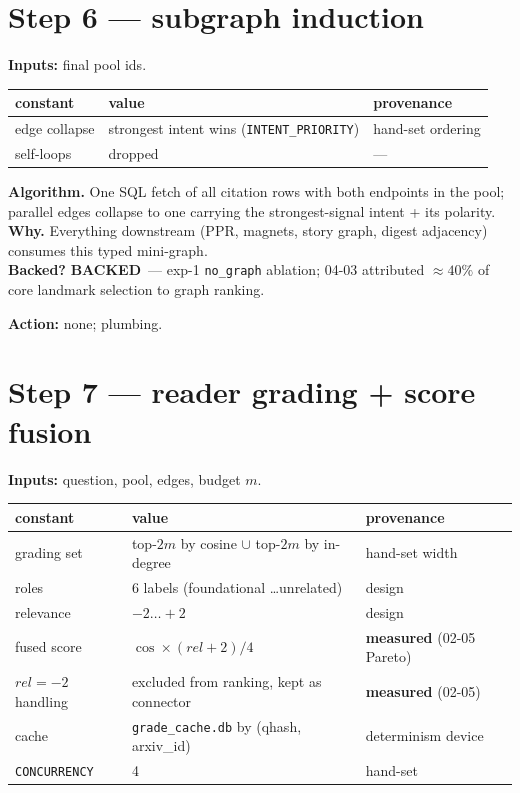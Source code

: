 \documentclass[10pt]{article}
\newenvironment{varbox}
  {\par\medskip\begin{lrbox}{\varboxsave}%
   \begin{minipage}{\dimexpr\linewidth-2\fboxsep\relax}\small\vspace{4pt}}
  {\vspace{4pt}\end{minipage}\end{lrbox}%
   \noindent\colorbox{boxbg}{\usebox{\varboxsave}}\par\medskip}
\newcommand{\backedyes}{\textcolor{green!50!black}{\textbf{BACKED}}}
\newcommand{\act}[1]{\par\smallskip\noindent\textbf{Action:} #1}
\begin{document}
\section{Step 6 --- subgraph induction}
\textbf{Inputs:} final pool ids.

\begin{varbox}
\begin{tabular}{@{}lll@{}}
\toprule
constant & value & provenance \\
\midrule
edge collapse & strongest intent wins (\texttt{INTENT\_PRIORITY}) & hand-set ordering \\
self-loops & dropped & --- \\
\bottomrule
\end{tabular}
\end{varbox}

\textbf{Algorithm.} One SQL fetch of all citation rows with both endpoints in the pool;
parallel edges collapse to one carrying the strongest-signal intent + its polarity. \\
\textbf{Why.} Everything downstream (PPR, magnets, story graph, digest adjacency) consumes
this typed mini-graph. \\
\textbf{Backed?} \backedyes\ --- exp-1 \texttt{no\_graph} ablation; 04-03 attributed
${\approx}40\%$ of core landmark selection to graph ranking. \\
\act{none; plumbing.}

\section{Step 7 --- reader grading + score fusion}
\textbf{Inputs:} question, pool, edges, budget $m$.

\begin{varbox}
\begin{tabular}{@{}lll@{}}
\toprule
constant & value & provenance \\
\midrule
grading set & top-$2m$ by cosine $\cup$ top-$2m$ by in-degree & hand-set width \\
roles & 6 labels (foundational \dots unrelated) & design \\
relevance & $-2 \dots +2$ & design \\
fused score & $\cos \times (rel+2)/4$ & \textbf{measured} (02-05 Pareto) \\
$rel = -2$ handling & excluded from ranking, kept as connector & \textbf{measured} (02-05) \\
cache & \texttt{grade\_cache.db} by (qhash, arxiv\_id) & determinism device \\
\texttt{CONCURRENCY} & 4 & hand-set \\
\bottomrule
\end{tabular}
\end{varbox}
\end{document}

